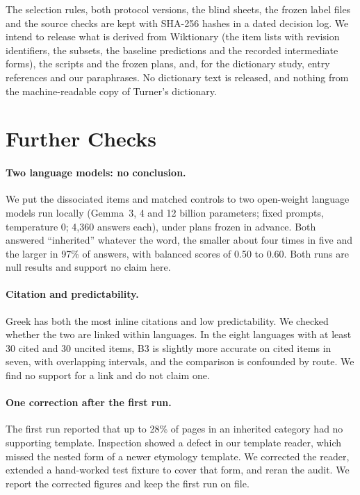 \documentclass[11pt]{article}
\begin{document}
The selection rules, both protocol versions, the blind sheets, the frozen label files and the source checks are kept with SHA-256 hashes in a dated decision log. We intend to release what is derived from Wiktionary (the item lists with revision identifiers, the subsets, the baseline predictions and the recorded intermediate forms), the scripts and the frozen plans, and, for the dictionary study, entry references and our paraphrases. No dictionary text is released, and nothing from the machine-readable copy of Turner's dictionary.

\section{Further Checks}
\label{app:further}

\paragraph{Two language models: no conclusion.} We put the dissociated items and matched controls to two open-weight language models run locally (Gemma~3, 4 and 12 billion parameters; fixed prompts, temperature 0; 4,360 answers each), under plans frozen in advance. Both answered ``inherited'' whatever the word, the smaller about four times in five and the larger in 97\% of answers, with balanced scores of 0.50 to 0.60. Both runs are null results and support no claim here.

\paragraph{Citation and predictability.} Greek has both the most inline citations and low predictability. We checked whether the two are linked within languages. In the eight languages with at least 30 cited and 30 uncited items, B3 is slightly more accurate on cited items in seven, with overlapping intervals, and the comparison is confounded by route. We find no support for a link and do not claim one.

\paragraph{One correction after the first run.} The first run reported that up to 28\% of pages in an inherited category had no supporting template. Inspection showed a defect in our template reader, which missed the nested form of a newer etymology template. We corrected the reader, extended a hand-worked test fixture to cover that form, and reran the audit. We report the corrected figures and keep the first run on file.
\end{document}
